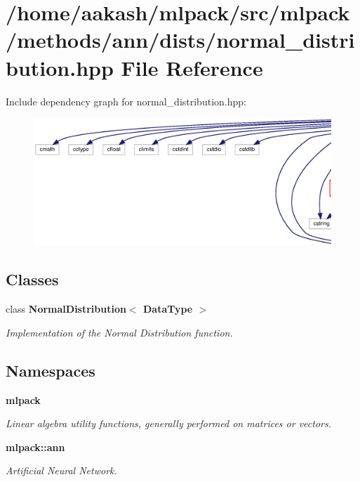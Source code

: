 \section{/home/aakash/mlpack/src/mlpack/methods/ann/dists/normal\+\_\+distribution.hpp File Reference}
\label{normal__distribution_8hpp}
Include dependency graph for normal\+\_\+distribution.\+hpp\+:
\nopagebreak
\begin{figure}[H]
\begin{center}
\leavevmode
\includegraphics[width=350pt]{normal__distribution_8hpp__incl}
\end{center}
\end{figure}
\subsection*{Classes}
\begin{DoxyCompactItemize}
\item 
class \textbf{ Normal\+Distribution$<$ Data\+Type $>$}
\begin{DoxyCompactList}\small\item\em Implementation of the Normal Distribution function. \end{DoxyCompactList}\end{DoxyCompactItemize}
\subsection*{Namespaces}
\begin{DoxyCompactItemize}
\item 
 \textbf{ mlpack}
\begin{DoxyCompactList}\small\item\em Linear algebra utility functions, generally performed on matrices or vectors. \end{DoxyCompactList}\item 
 \textbf{ mlpack\+::ann}
\begin{DoxyCompactList}\small\item\em Artificial Neural Network. \end{DoxyCompactList}\end{DoxyCompactItemize}



